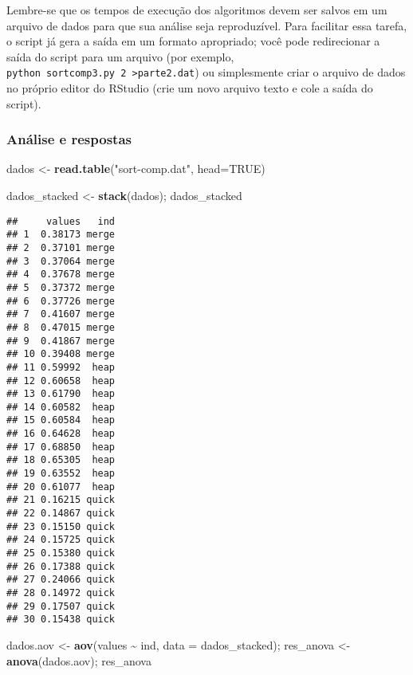 \documentclass[
]{article}
\newenvironment{Shaded}{\begin{snugshade}}{\end{snugshade}}
\newcommand{\AttributeTok}[1]{\textcolor[rgb]{0.13,0.29,0.53}{#1}}
\newcommand{\ConstantTok}[1]{\textcolor[rgb]{0.56,0.35,0.01}{#1}}
\newcommand{\FunctionTok}[1]{\textcolor[rgb]{0.13,0.29,0.53}{\textbf{#1}}}
\newcommand{\NormalTok}[1]{#1}
\newcommand{\OtherTok}[1]{\textcolor[rgb]{0.56,0.35,0.01}{#1}}
\newcommand{\SpecialCharTok}[1]{\textcolor[rgb]{0.81,0.36,0.00}{\textbf{#1}}}
\newcommand{\StringTok}[1]{\textcolor[rgb]{0.31,0.60,0.02}{#1}}
\begin{document}
Lembre-se que os tempos de execução dos algoritmos devem ser salvos em
um arquivo de dados para que sua análise seja reproduzível. Para
facilitar essa tarefa, o script já gera a saída em um formato
apropriado; você pode redirecionar a saída do script para um arquivo
(por exemplo,
\texttt{python\ sortcomp3.py\ 2\ \textgreater{}parte2.dat}) ou
simplesmente criar o arquivo de dados no próprio editor do RStudio (crie
um novo arquivo texto e cole a saída do script).

\hypertarget{anuxe1lise-e-respostas-1}{%
\subsubsection{Análise e respostas}\label{anuxe1lise-e-respostas-1}}

\begin{Shaded}
\begin{Highlighting}[]
\NormalTok{dados }\OtherTok{\textless{}{-}} \FunctionTok{read.table}\NormalTok{(}\StringTok{"sort{-}comp.dat"}\NormalTok{, }\AttributeTok{head=}\ConstantTok{TRUE}\NormalTok{)}

\NormalTok{dados\_stacked }\OtherTok{\textless{}{-}} \FunctionTok{stack}\NormalTok{(dados); dados\_stacked}
\end{Highlighting}
\end{Shaded}

\begin{verbatim}
##     values   ind
## 1  0.38173 merge
## 2  0.37101 merge
## 3  0.37064 merge
## 4  0.37678 merge
## 5  0.37372 merge
## 6  0.37726 merge
## 7  0.41607 merge
## 8  0.47015 merge
## 9  0.41867 merge
## 10 0.39408 merge
## 11 0.59992  heap
## 12 0.60658  heap
## 13 0.61790  heap
## 14 0.60582  heap
## 15 0.60584  heap
## 16 0.64628  heap
## 17 0.68850  heap
## 18 0.65305  heap
## 19 0.63552  heap
## 20 0.61077  heap
## 21 0.16215 quick
## 22 0.14867 quick
## 23 0.15150 quick
## 24 0.15725 quick
## 25 0.15380 quick
## 26 0.17388 quick
## 27 0.24066 quick
## 28 0.14972 quick
## 29 0.17507 quick
## 30 0.15438 quick
\end{verbatim}

\begin{Shaded}
\begin{Highlighting}[]
\NormalTok{dados.aov }\OtherTok{\textless{}{-}} \FunctionTok{aov}\NormalTok{(values }\SpecialCharTok{\textasciitilde{}}\NormalTok{ ind, }\AttributeTok{data =}\NormalTok{ dados\_stacked);}
\NormalTok{res\_anova }\OtherTok{\textless{}{-}} \FunctionTok{anova}\NormalTok{(dados.aov); res\_anova}
\end{Highlighting}
\end{Shaded}
\end{document}
